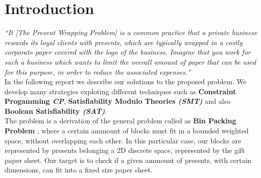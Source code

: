 \chapter{Introduction}
\textit{
    ``It [The Present Wrapping Problem] is a common practice that a private business rewards its loyal clients with presents, which are typically wrapped in a costly
    corporate paper covered with the logo of the business. Imagine that you work for such a business which wants to limit the overall amount of paper that can be used for this purpose,
    in order to reduce the associated expenses." \cite{project}
}
\\

In the following report we describe our solutions to the proposed problem.
We develop many strategies exploting different techniques such as \textbf{Constraint Progamming \textit{CP}},
\textbf{Satisfiability Modulo Theories \textit{(SMT)}} and also \textbf{Boolean Satisfiability \textit{(SAT)}}.
\\
The problem is a derivation of the general problem called as \textbf{Bin Packing Problem} \cite{binpack}, where a certain ammount of blocks must fit
in a bounded weighted space, without overlapping each other.
In this particular case, our blocks are represented by presents belonging a 2D discrete space, represented by the gift paper sheet.
Our target is to check if a given ammount of presents, with certain dimensions, can fit into a fixed size paper sheet. 